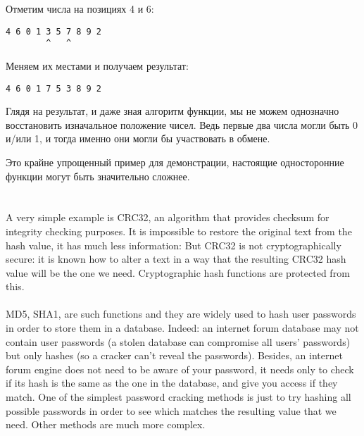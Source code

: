 Отметим числа на позициях 4 и 6:

\begin{lstlisting}
4 6 0 1 3 5 7 8 9 2
        ^   ^
\end{lstlisting}

Меняем их местами и получаем результат:

\begin{lstlisting}
4 6 0 1 7 5 3 8 9 2
\end{lstlisting}

Глядя на результат, и даже зная алгоритм функции, мы не можем однозначно восстановить изначальное
положение чисел.
Ведь первые два числа могли быть 0 и/или 1, и тогда именно они могли бы участвовать в обмене.

Это крайне упрощенный пример для демонстрации, настоящие односторонние функции могут быть значительно сложнее.
\fi %


\ifdefined\ENGLISH
\newcommand{\HashFuncChapterName}{%
}
\chapter{\HashFuncChapterName}
\label{hash_func}

\index{\HashFuncChapterName}
A very simple example is CRC32, an algorithm that provides  checksum for integrity checking purposes.
It is impossible to restore the original text from the hash value, it has much less information:
But CRC32 is not cryptographically secure: it is known how to alter a text in a way that the resulting
CRC32 hash value will be the one we need.
Cryptographic hash functions are protected from this. \\
\\
MD5, SHA1, \etc{} are such functions and they are widely used to hash user passwords in order to store them in a database.
Indeed: an internet forum database may not contain user passwords 
(a stolen database can compromise all users' passwords) but only hashes 
(so a cracker can't reveal the passwords).
Besides, an internet forum engine does not need to be aware of your password, it needs only to check if its hash
is the same as the one in the database, and give you access if they match.
One of the simplest password cracking methods is just to try hashing all possible passwords in order
to see which matches the resulting value that we need.
Other methods are much more complex.

